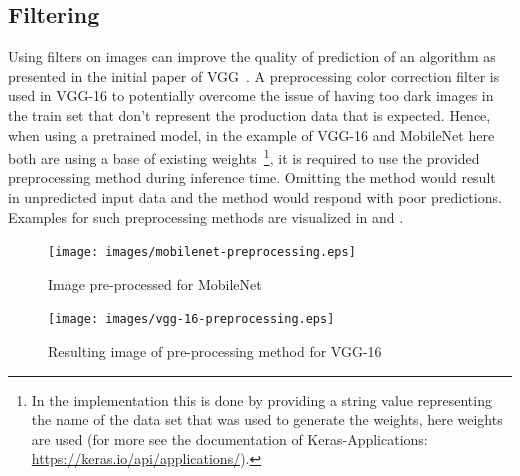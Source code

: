 \subsection{Filtering}\label{subsec:filtering}
Using filters on images can improve the quality of prediction of an algorithm as presented in the initial paper of VGG~\cite{VGG16}.
A preprocessing color correction filter is used in VGG-16 to potentially overcome the issue of having too dark images in the train set that don't represent the production data that is expected.
Hence, when using a pretrained model, in the example of VGG-16 and MobileNet here both are using a base of existing weights~\footnote{
    In the implementation this is done by providing a string value representing the name of the data set that was used to generate the weights, here  weights are used (for more see the documentation of Keras-Applications: \url{https://keras.io/api/applications/}).
}, it is required to use the provided preprocessing method during inference time.
Omitting the method would result in unpredicted input data and the method would respond with poor predictions.
Examples for such preprocessing methods are visualized in  and .

\begin{figure}[!ht]
    \begin{minipage}{0.45\textwidth}
        \texttt{[image: images/mobilenet-preprocessing.eps]}
        \caption{Image pre-processed for MobileNet}
        \label{fig:mobilenet-preprocessing}
    \end{minipage}
    \hfill
    \begin{minipage}{0.45\textwidth}
        \texttt{[image: images/vgg-16-preprocessing.eps]}
        \caption{Resulting image of pre-processing method for VGG-16}
        \label{fig:vgg-16-preprocessing}
    \end{minipage}
\end{figure}

